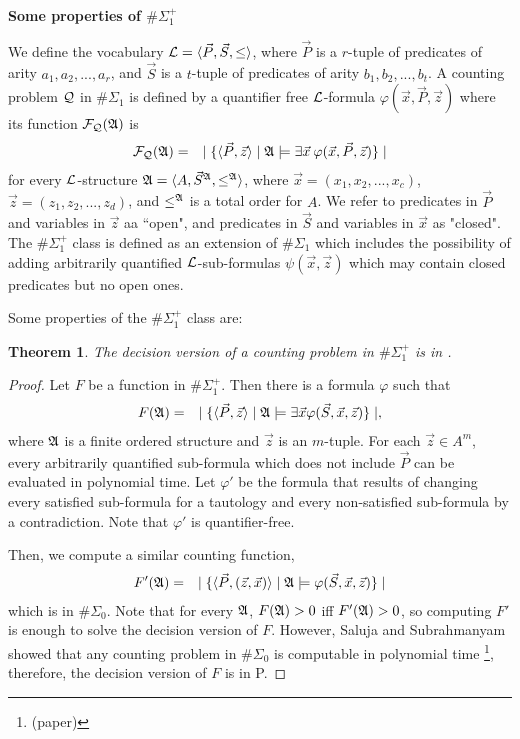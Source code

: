 \documentclass[12pt]{article}
\def\A{{\frak A}}
\def\L{{\cal L}}
\def\Q{{\cal Q}}
\def\F{{\cal F}}
\def\P{\vec{P}}
\def\S{\vec{S}}
\def\x{\vec{x}}
\def\z{\vec{z}}
\newtheorem{theo}{Theorem}
\begin{document}
\begin{center}
{ \LARGE \bf
  Some properties of $\#\Sigma_1^{+}$
}
\end{center}

We define the vocabulary $\L = \langle \P, \S, \leq \rangle$, where $\P$ is a $r$-tuple of predicates of arity $a_1,a_2,...,a_r$, and $\S$ is a $t$-tuple of predicates of arity $b_1,b_2,...,b_t$. A counting problem $\Q$ in $\#\Sigma_1$ is defined by a quantifier free $\L$-formula $\varphi(\x,\P,\z)$ where its function $\F_\Q(\A)$ is
\begin{eqnarray*}
\F_\Q(\A) &=& \mid \{ \langle \P, \z \rangle \mid \A \models \exists \x \: \varphi(\x,\P,\z) \} \mid
\end{eqnarray*}
for every $\L$-structure $\A = \langle A, \S^\A, \leq^\A \rangle$, where $\x = (x_1,x_2,...,x_c)$, $\z = (z_1,z_2,...,z_d)$, and $\leq^\A$ is a total order for $A$. We refer to predicates in $\P$ and variables in $\z$ aa ``open", and predicates in $\S$ and variables in $\x$ as "closed". The $\#\Sigma_1^{+}$ class is defined as an extension of $\#\Sigma_1$ which includes the possibility of adding arbitrarily quantified $\L$-sub-formulas $\psi(\x,\z)$ which may contain closed predicates but no open ones.

Some properties of the $\#\Sigma_1^{+}$ class are:

\begin{theo}
The decision version of a counting problem in $\#\Sigma_1^{+}$ is in .
\end{theo}
\begin{proof}
Let $F$ be a function in $\#\Sigma_1^{+}$. Then there is a formula $\varphi$ such that
\begin{eqnarray*}
F(\A) &=& \mid \{ \langle\P,\z\rangle \mid \A \models \exists \x \varphi(\S,\x,\z) \} \mid,
\end{eqnarray*}
where $\A$ is a finite ordered structure and $\z$ is an $m$-tuple. For each $\z \in A^m$, every arbitrarily quantified sub-formula which does not include $\P$ can be evaluated in polynomial time. Let $\varphi'$ be the formula that results of changing every satisfied sub-formula for a tautology and every non-satisfied sub-formula by a contradiction. Note that $\varphi'$ is quantifier-free.

Then, we compute a similar counting function,
\begin{eqnarray*}
F'(\A) &=& \mid \{ \langle\P,(\z,\x)\rangle \mid \A \models \varphi(\S,\x,\z) \} \mid
\end{eqnarray*}
which is in $\#\Sigma_0$. Note that for every $\A$, $F(\A) > 0$ iff $F'(\A) > 0$, so computing $F'$ is enough to solve the decision version of $F$. However, Saluja and Subrahmanyam showed that any counting problem in $\#\Sigma_0$ is computable in polynomial time \footnote[1]{(paper)}, therefore, the decision version of $F$ is in P.
\end{proof}
\end{document}
